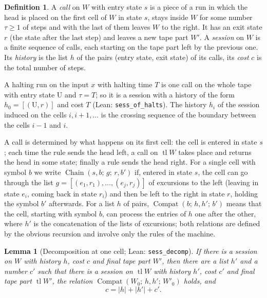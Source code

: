 \documentclass[11pt,a4paper]{amsart}
\newtheorem{lemma}[theorem]{Lemma}
\theoremstyle{definition}
\newtheorem{definition}[theorem]{Definition}
\theoremstyle{remark}
\newcommand{\U}{\mathrm{U}}
\newcommand{\lean}[1]{\texttt{#1}}
\newcommand{\len}[1]{\lvert #1\rvert}
\begin{document}
\begin{definition}
A \emph{call} on $W$ with entry state $s$ is a piece of a run in which the head is placed on the first cell
of $W$ in state $s$, stays inside $W$ for some number $\tau\ge1$ of steps and with the last of them leaves $W$
to the right. It has an exit state $r$ (the state after the last step) and leaves a new tape part $W'$.
A \emph{session} on $W$ is a finite sequence of calls, each starting on the tape part left by the previous
one. Its \emph{history} is the list $h$ of the pairs (entry state, exit state) of its calls, its \emph{cost}
$c$ is the total number of steps.
\end{definition}

A halting run on the input $x$ with halting time $T$ is one call on the whole tape with entry state $\U$ and
$\tau=T$; so it is a session with a history of the form $h_0=[(\U,r)]$ and cost $T$ (Lean:
\lean{sess\_of\_halts}). The history $h_i$ of the session induced on the cells $i,i+1,\dots$ is the crossing
sequence of the boundary between the cells $i-1$ and $i$.

A call is determined by what happens on its first cell: the cell is entered in state $s$; each time the rule
sends the head left, a call on $\operatorname{tl}W$ takes place and returns the head in some state; finally a
rule sends the head right. For a single cell with symbol $b$ we write
$\operatorname{Chain}(s,b;\,g;\,r,b')$ if, entered in state $s$, the cell can go through the list
$g=[(e_1,r_1),\dots,(e_j,r_j)]$ of excursions to the left (leaving in state $e_i$, coming back in state $r_i$)
and then be left to the right in state $r$, holding the symbol $b'$ afterwards. For a list $h$ of pairs,
$\operatorname{Compat}(b;\,h,h';\,b')$ means that the cell, starting with symbol $b$, can process the entries
of $h$ one after the other, where $h'$ is the concatenation of the lists of excursions; both relations
are defined by the obvious recursion and involve only the rules of the machine.

\begin{lemma}[Decomposition at one cell; Lean: \lean{sess\_decomp}]\label{lem:decomp}
If there is a session on $W$ with history $h$, cost $c$ and final tape part $W'$, then there are a list $h'$
and a number $c'$ such that there is a session on $\operatorname{tl}W$ with history $h'$, cost $c'$ and final
tape part $\operatorname{tl}W'$, the relation $\operatorname{Compat}(W_0;\,h,h';\,W'_0)$ holds, and
\[ c=\len{h}+\len{h'}+c'. \]
\end{lemma}
\end{document}
